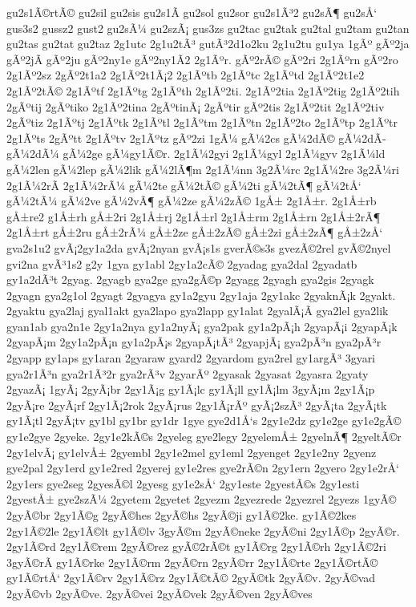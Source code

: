 {gu2s1Ã©rtÃ©
gu2sil
gu2sis
gu2s1Ã­
gu2sol
gu2sor
gu2s1Ã³2
gu2sÃ¶
gu2sÅ‘
gus3s2
gussz2
gust2
gu2sÃ¼
gu2szÃ¡
gus3zs
gu2tac
gu2tak
gu2tal
gu2tam
gu2tan
gu2tas
gu2tat
gu2taz
2g1utc
2g1u2tÃ³
gutÃ³2d1o2ku
2g1u2tu
gu1ya
1gÃº
gÃº2ja
gÃº2jÃ­
gÃº2ju
gÃº2ny1e
gÃº2ny1Ã­2
2g1Ãºr.
gÃº2rÃ©
gÃº2ri
2g1Ãºrn
gÃº2ro
2g1Ãº2sz
2gÃº2t1a2
2g1Ãº2t1Ã¡2
2g1Ãºtb
2g1Ãºtc
2g1Ãºtd
2g1Ãº2t1e2
2g1Ãº2tÃ©
2g1Ãºtf
2g1Ãºtg
2g1Ãºth
2g1Ãº2ti.
2g1Ãº2tia
2g1Ãº2tig
2g1Ãº2tih
2gÃºtij
2gÃºtiko
2g1Ãº2tina
2gÃºtinÃ¡
2gÃºtir
gÃº2tis
2g1Ãº2tit
2g1Ãº2tiv
2gÃºtiz
2g1Ãºtj
2g1Ãºtk
2g1Ãºtl
2g1Ãºtm
2g1Ãºtn
2g1Ãº2to
2g1Ãºtp
2g1Ãºtr
2g1Ãºts
2gÃºtt
2g1Ãºtv
2g1Ãºtz
gÃº2zi
1gÃ¼
gÃ¼2cs
gÃ¼2dÃ©
gÃ¼2dÃ­
gÃ¼2dÃ¼
gÃ¼2ge
gÃ¼gy1Ã©r.
2g1Ã¼2gyi
2g1Ã¼gyl
2g1Ã¼gyv
2g1Ã¼ld
gÃ¼2len
gÃ¼2lep
gÃ¼2lik
gÃ¼2lÃ¶m
2g1Ã¼nn
3g2Ã¼rc
2g1Ã¼2re
3g2Ã¼ri
2g1Ã¼2rÃ­
2g1Ã¼2rÃ¼
gÃ¼2te
gÃ¼2tÃ©
gÃ¼2ti
gÃ¼2tÃ¶
gÃ¼2tÅ‘
gÃ¼2tÃ¼
gÃ¼2ve
gÃ¼2vÃ¶
gÃ¼2ze
gÃ¼2zÃ©
1gÅ±
2g1Å±r.
2g1Å±rb
gÅ±re2
g1Å±rh
gÅ±2ri
2g1Å±rj
2g1Å±rl
2g1Å±rm
2g1Å±rn
2g1Å±2rÃ¶
2g1Å±rt
gÅ±2ru
gÅ±2rÃ¼
gÅ±2ze
gÅ±2zÃ©
gÅ±2zi
gÅ±2zÃ¶
gÅ±2zÅ‘
gva2s1u2
gvÃ¡2gy1a2da
gvÃ¡2nyan
gvÃ¡s1s
gverÃ©s3s
gvezÃ©2rel
gvÃ©2nyel
gvi2na
gvÃ³1s2
g2y
1gya
gy1abl
2gy1a2cÃ©
2gyadag
gya2dal
2gyadatb
gy1a2dÃ³t
2gyag.
2gyagb
gya2ge
gya2gÃ©p
2gyagg
2gyagh
gya2gis
2gyagk
2gyagn
gya2g1ol
2gyagt
2gyagya
gy1a2gyu
2gy1aja
2gy1akc
2gyaknÃ¡k
2gyakt.
2gyaktu
gya2laj
gyal1akt
gya2lapo
gya2lapp
gy1alat
2gyalÃ¡Ã­
gya2lel
gya2lik
gyan1ab
gya2n1e
2gy1a2nya
gy1a2nyÃ¡
gya2pak
gy1a2pÃ¡h
2gyapÃ¡i
2gyapÃ¡k
2gyapÃ¡m
2gy1a2pÃ¡n
gy1a2pÃ¡s
2gyapÃ¡tÃ³
2gyapjÃ¡
gya2pÃ³n
gya2pÃ³r
2gyapp
gy1aps
gy1aran
2gyaraw
gyard2
2gyardom
gya2rel
gy1argÃ³
3gyari
gya2r1Ã³n
gya2r1Ã³2r
gya2rÃ³v
2gyarÃº
2gyasak
2gyasat
2gyasra
2gyaty
2gyazÃ¡
1gyÃ¡
2gyÃ¡br
2gy1Ã¡g
gy1Ã¡lc
gy1Ã¡ll
gy1Ã¡lm
3gyÃ¡m
2gy1Ã¡p
2gyÃ¡re
2gyÃ¡rf
2gy1Ã¡2rok
2gyÃ¡rus
2gy1Ã¡rÃº
gyÃ¡2szÃ³
2gyÃ¡ta
2gyÃ¡tk
gy1Ã¡tl
2gyÃ¡tv
gy1bl
gy1br
gy1dr
1gye
gye2d1Å‘s
2gy1e2dz
gy1e2ge
gy1e2gÃ©
gy1e2gye
2gyeke.
2gy1e2kÃ©s
2gyeleg
gye2legy
2gyelemÅ±
2gyelnÃ¶
2gyeltÃ©r
2gy1elvÃ¡
gy1elvÅ±
2gyembl
2gy1e2mel
gy1eml
2gyenget
2gy1e2ny
2gyenz
gye2pal
2gy1erd
gy1e2red
2gyerej
gy1e2res
gye2rÃ©n
2gy1ern
2gyero
2gy1e2rÅ‘
2gy1ers
gye2seg
2gyesÃ©l
2gyesg
gy1e2sÅ‘
2gy1este
2gyestÃ©s
2gy1esti
2gyestÅ±
gye2szÃ¼
2gyetem
2gyetet
2gyezm
2gyezrede
2gyezrel
2gyezs
1gyÃ©
2gyÃ©br
2gy1Ã©g
2gyÃ©hes
2gyÃ©hs
2gyÃ©ji
gy1Ã©2ke.
gy1Ã©2kes
2gy1Ã©2le
2gy1Ã©lt
gy1Ã©lv
3gyÃ©m
2gyÃ©neke
2gyÃ©ni
2gy1Ã©p
2gyÃ©r.
2gy1Ã©rd
2gy1Ã©rem
2gyÃ©rez
gyÃ©2rÃ©t
gy1Ã©rg
2gy1Ã©rh
2gy1Ã©2ri
3gyÃ©rÃ­
gy1Ã©rke
2gy1Ã©rm
2gyÃ©rn
2gyÃ©rr
2gy1Ã©rte
2gy1Ã©rtÃ©
gy1Ã©rtÅ‘
2gy1Ã©rv
2gy1Ã©rz
2gy1Ã©tÃ©
2gyÃ©tk
2gyÃ©v.
2gyÃ©vad
2gyÃ©vb
2gyÃ©ve.
2gyÃ©vei
2gyÃ©vek
2gyÃ©ven
2gyÃ©ves
}
